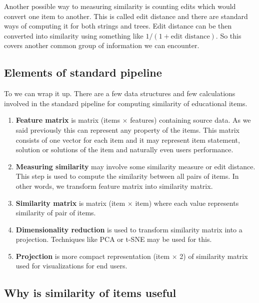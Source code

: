 \documentclass[
  digital, %
  table,   %
  nolof,     %
  nolot,     %
  nocover
]{fithesis3}
\begin{document}
Another possible way to measuring similarity is counting edits which would convert one item to another. This is called edit distance and there are standard ways of computing it for both strings and trees. Edit distance can be then converted into similarity using something like $1 / (1 + \text{edit distance})$. So this covers another common group of information we can encounter.

\subsection{Elements of standard pipeline}\label{elements-of-standard-pipeline}

To we can wrap it up. There are a few data structures and few calculations involved in the standard pipeline for computing similarity of educational items.

\begin{enumerate}
  \item
    \textbf{Feature matrix} is matrix (items $\times$ features) containing source data. As we said previously this can represent any property of the items. This matrix consists of one vector for each item and it may represent item statement, solution or solutions of the item and naturally even users performance.
  \item
    \textbf{Measuring similarity} may involve some similarity measure or edit distance. This step is used to compute the similarity between all pairs of items. In other words, we transform feature matrix into similarity matrix.
  \item
    \textbf{Similarity matrix} is matrix (item $\times$ item) where each value represents similarity of pair of items.
  \item
    \textbf{Dimensionality reduction} is used to transform similarity matrix into a projection. Techniques like PCA or t-SNE may be used for this.
  \item
    \textbf{Projection} is more compact representation (item $\times$ 2) of similarity matrix used for visualizations for end users.
\end{enumerate}

\subsection{Why is similarity of items useful}\label{why-is-similarity-of-items-useful}

\end{document}
